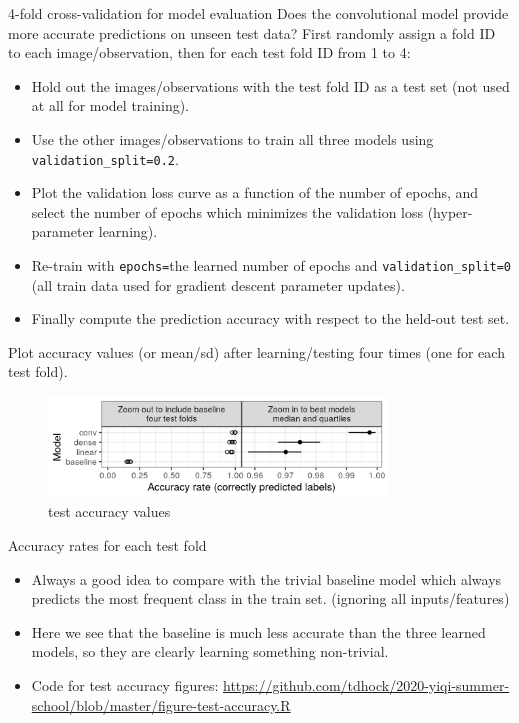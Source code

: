 \documentclass[12pt]{article}
\begin{document}
{4-fold cross-validation for model evaluation}
  Does the convolutional model provide more accurate predictions on
  unseen test data? First randomly assign a fold ID to each image/observation,
  then for each test fold ID from 1 to 4:
  \begin{itemize}
  \item Hold out the images/observations with the test fold ID as a
    test set (not used at all for model training).
  \item Use the other images/observations to train all three models
    using \texttt{validation\_split=0.2}.
  \item Plot the validation loss curve as a function of the number of
    epochs, and select the number of epochs which minimizes the
    validation loss (hyper-parameter learning).
  \item Re-train with \texttt{epochs=}the learned number of epochs and
    \texttt{validation\_split=0} (all train data used for gradient
    descent parameter updates).
  \item Finally compute the prediction accuracy with respect to the
    held-out test set.
  \end{itemize}
Plot accuracy values (or mean/sd) after learning/testing four times
(one for each test fold).

\begin{figure}
  \centering
  \includegraphics[width=0.8\textwidth]{figure-test-accuracy-both}
  \caption{test accuracy values}
  \label{fig:test-accuracy}
\end{figure}
 
{Accuracy rates for each test fold}
  \begin{itemize}
  \item Always a good idea to compare with the trivial baseline model which always
    predicts the most frequent class in the train set. (ignoring all
    inputs/features) 
  \item Here we see that the baseline is much less accurate than the
    three learned models, so they are clearly learning something non-trivial.
  \item Code for test accuracy figures:
    \url{https://github.com/tdhock/2020-yiqi-summer-school/blob/master/figure-test-accuracy.R}
  \end{itemize}
\end{document}

